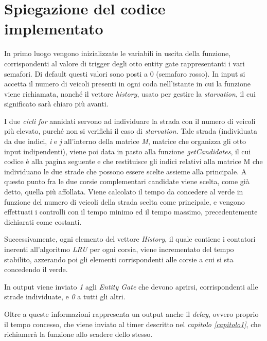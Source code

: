 \section{Spiegazione del codice implementato}
In primo luogo vengono inizializzate le variabili in uscita della funzione, corrispondenti al valore di trigger degli otto entity gate rappresentanti i vari semafori. Di default questi valori sono posti a 0 (semaforo rosso). In input si accetta il numero di veicoli presenti in ogni coda nell'istante in cui la funzione viene richiamata, nonché il vettore \textit{history}, usato per gestire la \textit{starvation}, il cui significato sarà chiaro più avanti.

I due \textit{cicli for} annidati servono ad individuare la strada con il numero di veicoli più elevato, purché non si verifichi il caso di \textit{starvation}. Tale strada (individuata da due indici, \textit{i} e \textit{j} all’interno della matrice \textit{M}, matrice che organizza gli otto input indipendenti), viene poi data in pasto alla funzione \textit{getCandidates}, il cui codice è alla pagina seguente e che restituisce gli indici relativi alla matrice M che individuano le due strade che possono essere scelte assieme alla principale. A questo punto fra le due corsie complementari candidate viene scelta, come già detto, quella più affollata. Viene calcolato il tempo da concedere al verde in funzione del numero di veicoli della strada scelta come principale, e vengono effettuati i controlli con il tempo minimo ed il tempo massimo, precedentemente dichiarati come costanti.

Successivamente, ogni elemento del vettore \textit{History}, il quale contiene i contatori inerenti all’algoritmo \textit{LRU} per ogni corsia, viene incrementato del tempo stabilito, azzerando poi gli elementi corrispondenti alle corsie a cui si sta concedendo il verde.

In output viene inviato \textit{1} agli \textit{Entity Gate} che devono aprirsi, corrispondenti alle strade individuate, e \textit{0} a tutti gli altri. 

Oltre a queste informazioni rappresenta un output anche il \textit{delay}, ovvero proprio il tempo concesso, che viene inviato al timer descritto nel \textit{capitolo \ref{capitolo1}}, che richiamerà la funzione allo scadere dello stesso.

